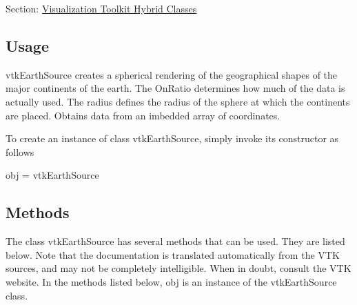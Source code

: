 Section\-: \hyperlink{sec_vtkhybrid}{Visualization Toolkit Hybrid Classes} \hypertarget{vtkwidgets_vtkxyplotwidget_Usage}{}\subsection{Usage}\label{vtkwidgets_vtkxyplotwidget_Usage}
vtk\-Earth\-Source creates a spherical rendering of the geographical shapes of the major continents of the earth. The On\-Ratio determines how much of the data is actually used. The radius defines the radius of the sphere at which the continents are placed. Obtains data from an imbedded array of coordinates.

To create an instance of class vtk\-Earth\-Source, simply invoke its constructor as follows \begin{DoxyVerb}  obj = vtkEarthSource
\end{DoxyVerb}
 \hypertarget{vtkwidgets_vtkxyplotwidget_Methods}{}\subsection{Methods}\label{vtkwidgets_vtkxyplotwidget_Methods}
The class vtk\-Earth\-Source has several methods that can be used. They are listed below. Note that the documentation is translated automatically from the V\-T\-K sources, and may not be completely intelligible. When in doubt, consult the V\-T\-K website. In the methods listed below, {\ttfamily obj} is an instance of the vtk\-Earth\-Source class. 
